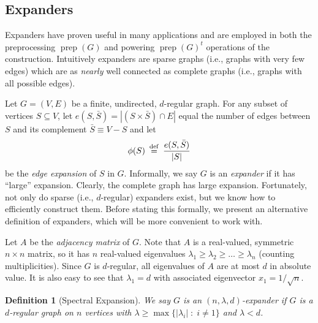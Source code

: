 \documentclass{article}
\newtheorem{definition}[theorem]{Definition}
\newcommand{\prep}{{\operatorname{prep}}}
\newcommand{\eqdef}{\mathbin{\stackrel{\rm def}{=}}}
\begin{document}
\subsection{Expanders}

Expanders have proven useful in many applications
and are employed in both the preprocessing $\prep(G)$ and powering $\prep(G)^t$ operations
of the construction.
Intuitively expanders are sparse graphs (i.e., graphs with very few edges)
which are as \emph{nearly} well connected as complete graphs (i.e., graphs with all possible edges).

Let $G = (V, E)$ be a finite, undirected, $d$-regular graph.
For any subset of vertices $S \subseteq V$,
let $e(S, \bar{S}) = |(S\times \bar{S})\cap E|$ equal the number of edges
between $S$ and its complement $\bar{S} \equiv V - S$ and
let
\begin{align*}
\phi(S) \;\eqdef\; \frac{e(S, \bar{S})}{|S|} %
\end{align*}
be the \emph{edge expansion} of $S$ in $G$.
Informally, we say $G$ is an \emph{expander} if it has ``large'' expansion.
Clearly, the complete graph has large expansion.
Fortunately, not only do sparse (i.e., $d$-regular) expanders exist,
but we know how to efficiently construct them.
Before stating this formally, we present an alternative definition of
expanders, which will be more convenient to work with.

Let $A$ be the \emph{adjacency matrix} of $G$.
Note that $A$ is a real-valued, symmetric $n \times n$ matrix,
so it has $n$ real-valued eigenvalues $\lambda_1 \ge \lambda_2 \ge \dots \ge \lambda_n$
(counting multiplicities).
Since $G$ is $d$-regular, all eigenvalues of $A$ are at most $d$ in absolute value.
It is also easy to see that $\lambda_1=d$ with associated
eigenvector $x_1 = 1/\sqrt{n}$.

\begin{definition}[Spectral Expansion]
We say $G$ is an $(n, \lambda, d)$-expander if $G$ is a $d$-regular graph
on $n$ vertices with $\lambda \ge \max \{|\lambda_i| \;:\; i \neq 1\}$
and $\lambda < d$.
\end{definition}
\end{document}

